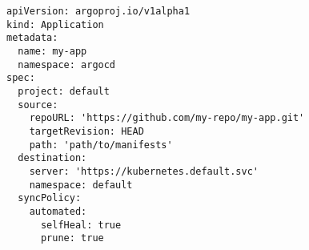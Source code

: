 \begin{verbatim}
apiVersion: argoproj.io/v1alpha1
kind: Application
metadata:
  name: my-app
  namespace: argocd
spec:
  project: default
  source:
    repoURL: 'https://github.com/my-repo/my-app.git'
    targetRevision: HEAD
    path: 'path/to/manifests'
  destination:
    server: 'https://kubernetes.default.svc'
    namespace: default
  syncPolicy:
    automated:
      selfHeal: true
      prune: true
\end{verbatim}